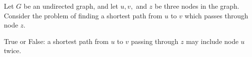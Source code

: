 \begin{prob}
    Let $G$ be an undirected graph, and let $u, v,$ and $z$ be three nodes in the graph. Consider
    the problem of finding a shortest path from $u$ to $v$ which passes through node $z$.

    True or False: a shortest path from $u$ to $v$ passing through $z$ may include node $u$ twice.

    \Tf{}

\end{prob}
